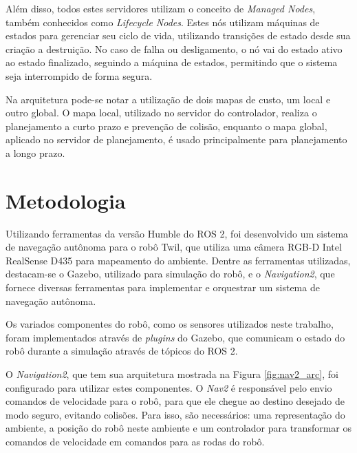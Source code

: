 \documentclass[repeatfields,xlists,xpacks,oneside,yearsonly]{ufrgscca}
\begin{document}
Além disso, todos estes servidores utilizam o conceito de \textit{Managed Nodes},
também conhecidos como \textit{Lifecycle Nodes}.
Estes nós utilizam máquinas de estados para gerenciar seu ciclo de vida, utilizando
transições de estado desde sua criação a destruição.
No caso de falha ou desligamento, o nó vai do estado ativo ao estado finalizado,
seguindo a máquina de estados, permitindo que o sistema seja interrompido
de forma segura.

Na arquitetura pode-se notar a utilização de dois mapas de custo, um local e
outro global.
O mapa local, utilizado no servidor do controlador, realiza o planejamento
a curto prazo e prevenção de colisão, enquanto o mapa global,
aplicado no servidor de planejamento, é usado principalmente
para planejamento a longo prazo.

\chapter{Metodologia}
\label{desenvolvimento}

Utilizando ferramentas da versão Humble do ROS 2, foi desenvolvido um sistema de
navegação autônoma para o robô Twil, que utiliza uma câmera RGB-D Intel RealSense D435
para mapeamento do ambiente.
Dentre as ferramentas utilizadas, destacam-se o Gazebo, utilizado para simulação do robô,
e o \textit{Navigation2}, que fornece diversas ferramentas para implementar
e orquestrar um sistema de navegação autônoma.

Os variados componentes do robô, como os sensores utilizados neste trabalho,
foram implementados através de \textit{plugins} do Gazebo,
que comunicam o estado do robô durante a simulação através de tópicos do ROS 2.


O \textit{Navigation2}, que tem sua arquitetura mostrada na Figura
\ref{fig:nav2_arc}, foi configurado para utilizar estes componentes.
O \textit{Nav2} é responsável pelo envio comandos de velocidade para o robô, para que ele chegue
ao destino desejado de modo seguro, evitando colisões.
Para isso, são necessários: uma representação do ambiente, a posição do robô neste ambiente e
um controlador para transformar os comandos de velocidade em comandos para as rodas do robô.
\end{document}
